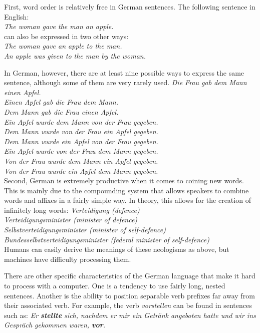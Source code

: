 \documentclass[]{../metanetpaper}
\begin{document}
\begin{Parallel}[c]{80mm}{80mm}
{    First, word order is relatively free in German sentences. The following sentence in English:\\
    \textit{The woman gave the man an apple.}\\
      can also be expressed in two other ways:\\
    \textit{The woman gave an apple to the man.\\
      An apple was given to the man by the woman.}

      In German, however, there are at least nine possible ways to express the same sentence, although some of them are very rarely used.
    \textit{
      Die Frau gab dem Mann einen Apfel.\\
      Einen Apfel gab die Frau dem Mann.\\
      Dem Mann gab die Frau einen Apfel.\\
      Ein Apfel wurde dem Mann von der Frau gegeben.\\
      Dem Mann wurde von der Frau ein Apfel gegeben.\\
      Dem Mann wurde ein Apfel von der Frau gegeben.\\
      Ein Apfel wurde von der Frau dem Mann gegeben.\\
      Von der Frau wurde dem Mann ein Apfel gegeben.\\
      Von der Frau wurde ein Apfel dem Mann gegeben.}\\

    Second, German is extremely productive when it comes to coining new words. This is mainly due to the compounding system that allows speakers to combine words and affixes in a fairly simple way. In theory, this allows for the creation of infinitely long words:
    \textit{
      Verteidigung (defence)\\
      Verteidigungsminister (minister of defence)\\
      Selbstverteidigungsminister (minister of self-defence)\\
      Bundesselbstverteidigungsminister (federal minister of self-defence)}\\

    Humans can easily derive the meanings of these neologisms as above, but machines have difficulty processing them. 

    There are other specific characteristics of the German language that make it hard to process with a computer. One is a tendency to use fairly long, nested sentences. Another is the ability to position separable verb prefixes far away from their associated verb. For example, the verb \textit{vorstellen} can be found in sentences such as:
    \textit{Er \textbf{stellte} sich, nachdem er mir ein Getränk angeboten hatte und wir ins Gespräch gekommen waren, \textbf{vor}.}\\

}
\end{Parallel}
\end{document}
